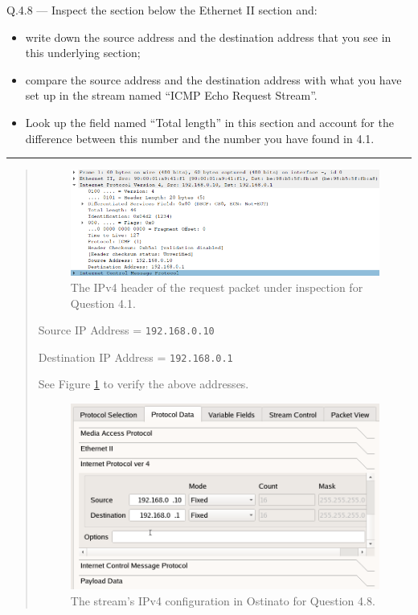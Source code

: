 \documentclass{article}
\newcommand\Que[2]{%
   \begin{samepage}
   \leavevmode\par
   \noindent
   Q.#1 --- #2\par\vspace{10pt}\hrule\vspace{10pt}
   \end{samepage}}
\newenvironment{ans}
   {\fbox{Answer}\begin{quote}\nopagebreak}
   {\end{quote}}
\begin{document}
\Que{4.8}{Inspect the section below the Ethernet II section and:
\begin{itemize}
\item write down the source address and the destination address
      that you see in this underlying section;
\item compare the source address and the destination address with
      what you have set up in the stream named ``ICMP Echo
      Request Stream''.
\item Look up the field named ``Total length'' in this section
      and account for the difference between this number and the
      number you have found in 4.1.
\end{itemize}}

\begin{ans}
\begin{figure}[H]
\centering
\includegraphics[width=14cm]{data/q4.8-ip-header.png}
\caption{The IPv4 header of the request packet under
inspection for Question 4.1.}
\label{fig:ip-header-for-q4.8}
\end{figure}

Source IP Address = \texttt{192.168.0.10}

Destination IP Address = \texttt{192.168.0.1}

See Figure \ref{fig:ip-header-for-q4.8} to verify the above
addresses.

\begin{figure}[H]
\centering
\includegraphics[width=14cm]{data/q4.8-stream-config.png}
\caption{The stream's IPv4 configuration in Ostinato for Question 4.8.}
\label{fig:stream-config-for-q4.8}
\end{figure}


\end{ans}
\end{document}
